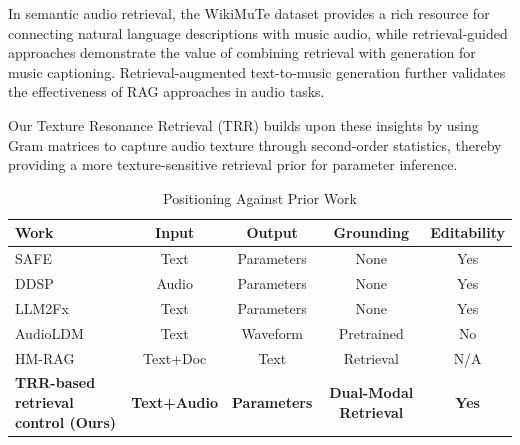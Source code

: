 In semantic audio retrieval, the WikiMuTe dataset \citep{weck2023wikimute} provides a rich resource for connecting natural language descriptions with music audio, while retrieval-guided approaches \citep{srivatsan2024retrieval} demonstrate the value of combining retrieval with generation for music captioning. Retrieval-augmented text-to-music generation \citep{gonzales2024rag} further validates the effectiveness of RAG approaches in audio tasks.

Our Texture Resonance Retrieval (TRR) builds upon these insights by using Gram matrices to capture audio texture through second-order statistics, thereby providing a more texture-sensitive retrieval prior for parameter inference.

\begin{table}[t]
			\centering
			\caption{Positioning Against Prior Work}
			\label{tab:positioning}
		\small
		\begin{tabular}{lcccc}
		\toprule
		\textbf{Work}               & \textbf{Input}      & \textbf{Output}     & \textbf{Grounding}      & \textbf{Editability} \\
		\midrule
		SAFE \citep{stables2014semantic}             & Text                                 & Parameters                           & None                                     & Yes                                   \\
		DDSP \citep{engel2020ddsp}                   & Audio                                & Parameters                           & None                                     & Yes                                   \\
		LLM2Fx \citep{doh2025llm2fx}                 & Text                                 & Parameters                           & None                                     & Yes                                   \\
		AudioLDM \citep{liu2023audioldm}             & Text                                 & Waveform                             & Pretrained                               & No                                    \\
		HM-RAG \citep{liu2025hmrag}                  & Text+Doc                             & Text                                 & Retrieval                                & N/A                                   \\
			\midrule
			\textbf{TRR-based retrieval control (Ours)} & \textbf{Text+Audio} & \textbf{Parameters} & \textbf{Dual-Modal Retrieval} & \textbf{Yes}         \\
			\bottomrule
		\end{tabular}
\end{table}


